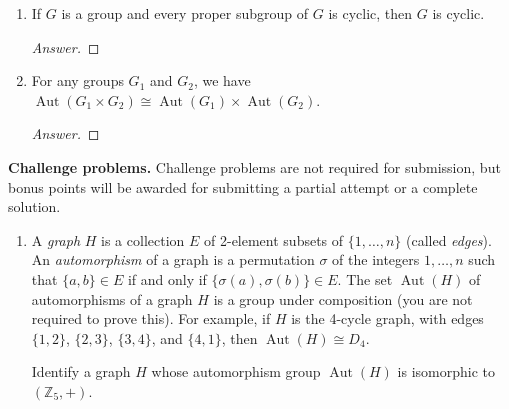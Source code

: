 \documentclass{article}
\theoremstyle{definition}
\numberwithin{equation}{section}
\newcommand{\ring}[1]{\ensuremath{\mathbb{#1}}}
\renewcommand\>{\rangle}
\newcommand\<{\langle}
\newcommand\0{\mathbf{0}}
\newcommand\ZZ{\ring{Z}}
\newcommand\iso{\cong}
\DeclareMathOperator\Aut{Aut} %
\begin{document}
\begin{enumerate}[(H1)]
\begin{enumerate}
\begin{proof}[Answer]

\end{proof}


\item 
If $G$ is a group and every proper subgroup of $G$ is cyclic, then $G$ is cyclic.  

\begin{proof}[Answer]

\end{proof}


\item 
For any groups $G_1$ and $G_2$, we have $\Aut(G_1 \times G_2) \iso \Aut(G_1) \times \Aut(G_2)$.  

\begin{proof}[Answer]

\end{proof}


\end{enumerate}

\end{enumerate}



\bigskip
\noindent
\textbf{Challenge problems.}
Challenge problems are not required for submission, but bonus points will be awarded for submitting a partial attempt or a complete solution.  

\begin{enumerate}[(C1)]
\item 
A \emph{graph} $H$ is a collection $E$ of 2-element subsets of $\{1, \ldots, n\}$ (called \emph{edges}).  An \emph{automorphism} of a graph is a permutation $\sigma$ of the integers $1, \ldots, n$ such that $\{a,b\} \in E$ if and only if $\{\sigma(a), \sigma(b)\} \in E$.  The set $\Aut(H)$ of automorphisms of a graph $H$ is a group under composition (you are not required to prove this).  For example, if $H$ is the 4-cycle graph, with edges $\{1,2\}$, $\{2,3\}$, $\{3,4\}$, and $\{4,1\}$, then $\Aut(H) \iso D_4$.  

Identify a graph $H$ whose automorphism group $\Aut(H)$ is isomorphic to $(\ZZ_5, +)$.  

\end{enumerate}
\end{document}
